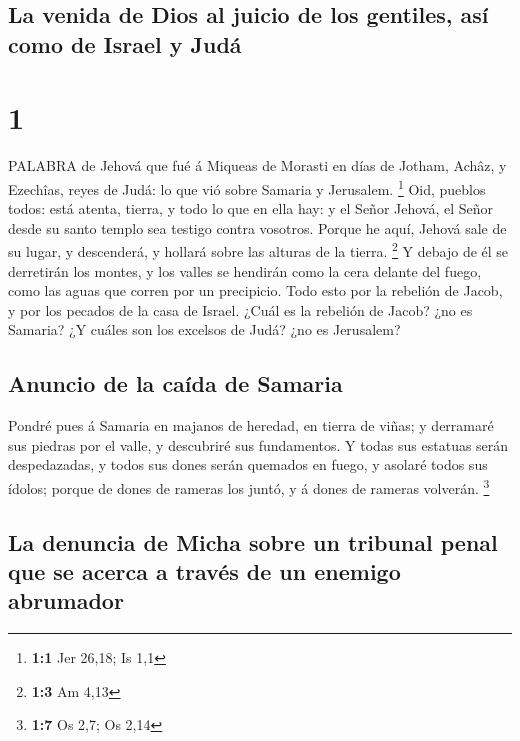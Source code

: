 \hypertarget{la-venida-de-dios-al-juicio-de-los-gentiles-asuxed-como-de-israel-y-juduxe1}{%
\subsection{La venida de Dios al juicio de los gentiles, así como de
Israel y
Judá}\label{la-venida-de-dios-al-juicio-de-los-gentiles-asuxed-como-de-israel-y-juduxe1}}

\hypertarget{section}{%
\section{1}\label{section}}

 PALABRA de Jehová que fué á Miqueas de Morasti en días de
Jotham, Achâz, y Ezechîas, reyes de Judá: lo que vió sobre Samaria y
Jerusalem. \footnote{\textbf{1:1} Jer 26,18; Is 1,1}  Oid,
pueblos todos: está atenta, tierra, y todo lo que en ella hay: y el
Señor Jehová, el Señor desde su santo templo sea testigo contra
vosotros.  Porque he aquí, Jehová sale de su lugar, y
descenderá, y hollará sobre las alturas de la tierra. \footnote{\textbf{1:3}
  Am 4,13}  Y debajo de él se derretirán los montes, y los
valles se hendirán como la cera delante del fuego, como las aguas que
corren por un precipicio.  Todo esto por la rebelión de
Jacob, y por los pecados de la casa de Israel. ¿Cuál es la rebelión de
Jacob? ¿no es Samaria? ¿Y cuáles son los excelsos de Judá? ¿no es
Jerusalem?

\hypertarget{anuncio-de-la-cauxedda-de-samaria}{%
\subsection{Anuncio de la caída de
Samaria}\label{anuncio-de-la-cauxedda-de-samaria}}

 Pondré pues á Samaria en majanos de heredad, en tierra de
viñas; y derramaré sus piedras por el valle, y descubriré sus
fundamentos.  Y todas sus estatuas serán despedazadas, y
todos sus dones serán quemados en fuego, y asolaré todos sus ídolos;
porque de dones de rameras los juntó, y á dones de rameras volverán.
\footnote{\textbf{1:7} Os 2,7; Os 2,14}

\hypertarget{la-denuncia-de-micha-sobre-un-tribunal-penal-que-se-acerca-a-travuxe9s-de-un-enemigo-abrumador}{%
\subsection{La denuncia de Micha sobre un tribunal penal que se acerca a
través de un enemigo
abrumador}\label{la-denuncia-de-micha-sobre-un-tribunal-penal-que-se-acerca-a-travuxe9s-de-un-enemigo-abrumador}}

